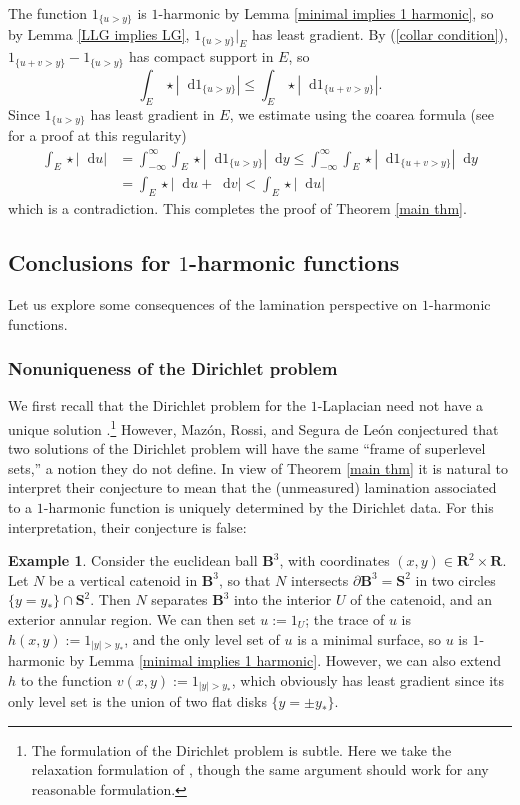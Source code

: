 \documentclass[reqno,11pt]{amsart}
\newcommand{\RR}{\mathbf{R}}
\newcommand{\Sph}{\mathbf S}
\newcommand{\Ball}{\mathbf{B}}
\newcommand*\dif{\mathop{}\!\mathrm{d}}
\theoremstyle{definition}
\newtheorem{example}[theorem]{Example}
\numberwithin{equation}{section}
\begin{document}
The function $1_{\{u > y\}}$ is $1$-harmonic by Lemma \ref{minimal implies 1 harmonic}, so by Lemma \ref{LLG implies LG}, $1_{\{u > y\}}|_E$ has least gradient.
By (\ref{collar condition}), $1_{\{u + v > y\}} - 1_{\{u > y\}}$ has compact support in $E$, so 
$$\int_E \star |\dif 1_{\{u > y\}}| \leq \int_E \star |\dif 1_{\{u + v > y\}}|.$$
Since $1_{\{u > y\}}$ has least gradient in $E$, we estimate using the coarea formula (see \cite[Proposition 2.5]{BackusFLG} for a proof at this regularity)
\begin{align*}
\int_E \star |\dif u| &= \int_{-\infty}^\infty \int_E \star |\dif 1_{\{u > y\}}| \dif y \leq \int_{-\infty}^\infty \int_E \star |\dif 1_{\{u + v > y\}}| \dif y \\
&= \int_E \star |\dif u + \dif v| < \int_E \star |\dif u|
\end{align*}
which is a contradiction.
This completes the proof of Theorem \ref{main thm}.

\subsection{Conclusions for \texorpdfstring{$1$-harmonic}{one-harmonic} functions}\label{1harmonic apps}
Let us explore some consequences of the lamination perspective on $1$-harmonic functions.

\subsubsection{Nonuniqueness of the Dirichlet problem}
We first recall that the Dirichlet problem for the $1$-Laplacian need not have a unique solution \cite[Example 2.7]{Mazon14}.\footnote{The formulation of the Dirichlet problem is subtle. Here we take the relaxation formulation of \cite[Definition 2.3]{Mazon14}, though the same argument should work for any reasonable formulation.}
However, Maz\'on, Rossi, and Segura de Le\'on \cite[Remark 2.8]{Mazon14} conjectured that two solutions of the Dirichlet problem will have the same ``frame of superlevel sets,'' a notion they do not define.
In view of Theorem \ref{main thm} it is natural to interpret their conjecture to mean that the (unmeasured) lamination associated to a $1$-harmonic function is uniquely determined by the Dirichlet data.
For this interpretation, their conjecture is false:

\begin{example}
Consider the euclidean ball $\Ball^3$, with coordinates $(x, y) \in \RR^2 \times \RR$.
Let $N$ be a vertical catenoid in $\Ball^3$, so that $N$ intersects $\partial \Ball^3 = \Sph^2$ in two circles $\{y = y_*\} \cap \Sph^2$.
Then $N$ separates $\Ball^3$ into the interior $U$ of the catenoid, and an exterior annular region.
We can then set $u := 1_U$; the trace of $u$ is $h(x, y) := 1_{|y| > y_*}$, and the only level set of $u$ is a minimal surface, so $u$ is $1$-harmonic by Lemma \ref{minimal implies 1 harmonic}.
However, we can also extend $h$ to the function $v(x, y) := 1_{|y| > y_*}$, which obviously has least gradient since its only level set is the union of two flat disks $\{y = \pm y_*\}$.
\end{example}
\end{document}
